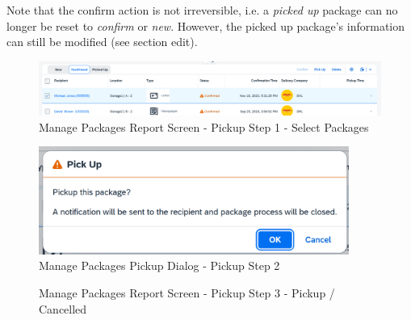 \bigskip
Note that the confirm action is not irreversible, i.e. a \textit{picked up} package can no longer be reset to \textit{confirm} or \textit{new}. However, the picked up package's information can still be modified (see section edit).

\begin{figure}[H]
	\centering
	\includegraphics[width=1\linewidth]{images/user_doc/managePack/ReportScreen/pickup/pickupEnabled.png}
	\caption{Manage Packages Report Screen - Pickup Step 1 - Select Packages}
	\label{fig:MPReportPickupBtn}
\end{figure}

\begin{figure}[H]
	\centering
	\includegraphics[height=100pt]{images/user_doc/managePack/ReportScreen/pickup/pickupDialogOk.png}
	\caption{Manage Packages Pickup Dialog - Pickup Step 2}
	\label{fig:MPReportPickupDlg}
\end{figure}

\begin{figure}[H]
	\centering
	\hspace{5pt}
    \caption{Manage Packages Report Screen - Pickup Step 3 - Pickup / Cancelled}
	\label{fig:MPReportPickupDlgButton}
\end{figure}

